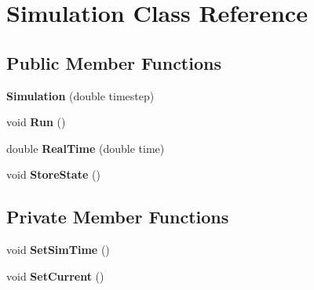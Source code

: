 \hypertarget{classSimulation}{\section{Simulation Class Reference}
\label{classSimulation}
}
\subsection*{Public Member Functions}
\begin{DoxyCompactItemize}
\item 
\hypertarget{classSimulation_ac8fa72ffa9651718c2268608eb50d764}{{\bfseries Simulation} (double timestep)}\label{classSimulation_ac8fa72ffa9651718c2268608eb50d764}

\item 
\hypertarget{classSimulation_af0ad94212fd0a5af2f3f0b3a9be1b3a7}{void {\bfseries Run} ()}\label{classSimulation_af0ad94212fd0a5af2f3f0b3a9be1b3a7}

\item 
\hypertarget{classSimulation_a392aea290dd061cb9d2e57ff05158c48}{double {\bfseries Real\-Time} (double time)}\label{classSimulation_a392aea290dd061cb9d2e57ff05158c48}

\item 
\hypertarget{classSimulation_a0515736dc180248d10797fefeb7b99c9}{void {\bfseries Store\-State} ()}\label{classSimulation_a0515736dc180248d10797fefeb7b99c9}

\end{DoxyCompactItemize}
\subsection*{Private Member Functions}
\begin{DoxyCompactItemize}
\item 
\hypertarget{classSimulation_a498c434f0c449dd257025e8453f703c1}{void {\bfseries Set\-Sim\-Time} ()}\label{classSimulation_a498c434f0c449dd257025e8453f703c1}

\item 
\hypertarget{classSimulation_ae252ae64adc5a442c37c6214abe92ac7}{void {\bfseries Set\-Current} ()}\label{classSimulation_ae252ae64adc5a442c37c6214abe92ac7}

\end{DoxyCompactItemize}
